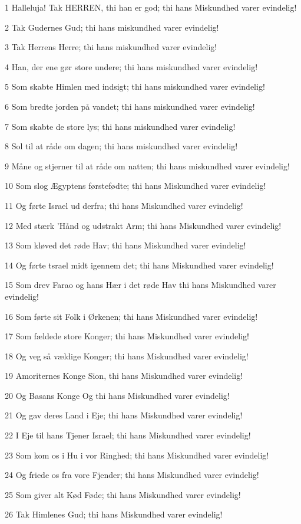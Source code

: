 \par 1 Halleluja! Tak HERREN, thi han er god; thi hans Miskundhed varer evindelig!
\par 2 Tak Gudernes Gud; thi hans miskundhed varer evindelig!
\par 3 Tak Herrens Herre; thi hans miskundhed varer evindelig!
\par 4 Han, der ene gør store undere; thi hans miskundhed varer evindelig!
\par 5 Som skabte Himlen med indsigt; thi hans miskundhed varer evindelig!
\par 6 Som bredte jorden på vandet; thi hans miskundhed varer evindelig!
\par 7 Som skabte de store lys; thi hans miskundhed varer evindelig!
\par 8 Sol til at råde om dagen; thi hans miskundhed varer evindelig!
\par 9 Måne og stjerner til at råde om natten; thi hans miskundhed varer evindelig!
\par 10 Som slog Ægyptens førstefødte; thi hans Miskundhed varer evindelig!
\par 11 Og førte Israel ud derfra; thi hans Miskundhed varer evindelig!
\par 12 Med stærk 'Hånd og udstrakt Arm; thi hans Miskundhed varer evindelig!
\par 13 Som kløved det røde Hav; thi hans Miskundhed varer evindelig!
\par 14 Og førte tsrael midt igennem det; thi hans Miskundhed varer evindelig!
\par 15 Som drev Farao og hans Hær i det røde Hav thi hans Miskundhed varer evindelig!
\par 16 Som førte sit Folk i Ørkenen; thi hans Miskundhed varer evindelig!
\par 17 Som fældede store Konger; thi hans Miskundhed varer evindelig!
\par 18 Og veg så vældige Konger; thi hans Miskundhed varer evindelig!
\par 19 Amoriternes Konge Sion, thi hans Miskundhed varer evindelig!
\par 20 Og Basans Konge Og thi hans Miskundhed varer evindelig!
\par 21 Og gav deres Land i Eje; thi hans Miskundhed varer evindelig!
\par 22 I Eje til hans Tjener Israel; thi hans Miskundhed varer evindelig!
\par 23 Som kom os i Hu i vor Ringhed; thi hans Miskundhed varer evindelig!
\par 24 Og friede os fra vore Fjender; thi hans Miskundhed varer evindelig!
\par 25 Som giver alt Kød Føde; thi hans Miskundhed varer evindelig!
\par 26 Tak Himlenes Gud; thi hans Miskundhed varer evindelig!

